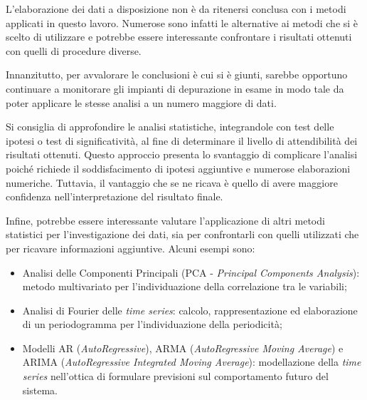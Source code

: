 L'elaborazione dei dati a disposizione non è da ritenersi conclusa con i metodi applicati in questo lavoro. Numerose sono infatti le alternative ai metodi che si è scelto di utilizzare e potrebbe essere interessante confrontare i risultati ottenuti con quelli di procedure diverse. 

Innanzitutto, per avvalorare le conclusioni è cui si è giunti, sarebbe opportuno continuare a monitorare gli impianti di depurazione in esame in modo tale da poter applicare le stesse analisi a un numero maggiore di dati. 

Si consiglia di approfondire le analisi statistiche, integrandole con test delle ipotesi o test di significatività, al fine di determinare il livello di attendibilità dei risultati ottenuti. Questo approccio presenta lo svantaggio di complicare l'analisi poiché richiede il soddisfacimento di ipotesi aggiuntive e numerose elaborazioni numeriche. Tuttavia, il vantaggio che se ne ricava è quello di avere maggiore confidenza nell'interpretazione del risultato finale.

Infine, potrebbe essere interessante valutare l'applicazione di altri metodi statistici per l'investigazione dei dati, sia per confrontarli con quelli utilizzati che per ricavare informazioni aggiuntive. Alcuni esempi sono:
\begin{itemize}
	\item Analisi delle Componenti Principali (PCA - \textit{Principal Components Analysis}): metodo multivariato per l'individuazione della correlazione tra le variabili;
	\item Analisi di Fourier delle \textit{time series}: calcolo, rappresentazione ed elaborazione di un periodogramma per l'individuazione della periodicità;
	\item Modelli AR (\textit{AutoRegressive}), ARMA (\textit{AutoRegressive Moving Average}) e ARIMA (\textit{AutoRegressive Integrated Moving Average}): modellazione della \textit{time series} nell'ottica di formulare previsioni sul comportamento futuro del sistema.
\end{itemize}

  